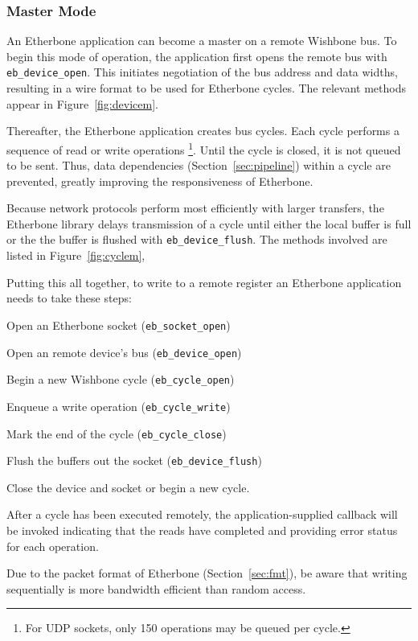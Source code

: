 \documentclass{article}
\newenvironment{packed_enum}{
\begin{enumerate}
  \setlength{\itemsep}{1pt}
  \setlength{\parskip}{0pt}
  \setlength{\parsep}{0pt}
}{\end{enumerate}}
\begin{document}
\subsubsection{Master Mode}

An Etherbone application can become a master on a remote Wishbone bus.
To begin this mode of operation, 
the application first opens the remote bus with \texttt{eb\_device\_open}.
This initiates negotiation of the bus address and data widths,
resulting in a wire format to be used for Etherbone cycles.
The relevant methods appear in Figure~\ref{fig:devicem}.

Thereafter, the Etherbone application creates bus cycles.
Each cycle performs a sequence of read or write operations
\footnote{For UDP sockets,
only 150 operations may be queued per cycle.}.
Until the cycle is closed, it is not queued to be sent.
Thus, data dependencies (Section~\ref{sec:pipeline}) within a cycle
are prevented,
greatly improving the responsiveness of Etherbone.

Because network protocols perform most efficiently with larger transfers,
the Etherbone library delays transmission of a cycle until
either the local buffer is full or the the buffer is flushed with
\texttt{eb\_device\_flush}.
The methods involved are listed in Figure~\ref{fig:cyclem},

Putting this all together,
to write to a remote register an Etherbone application needs to take these
steps:
\begin{packed_enum}
\item Open an Etherbone socket (\texttt{eb\_socket\_open})
\item Open an remote device's bus (\texttt{eb\_device\_open})
\item Begin a new Wishbone cycle (\texttt{eb\_cycle\_open})
\item Enqueue a write operation (\texttt{eb\_cycle\_write})
\item Mark the end of the cycle (\texttt{eb\_cycle\_close})
\item Flush the buffers out the socket (\texttt{eb\_device\_flush})
\item Close the device and socket or begin a new cycle.
\end{packed_enum}

After a cycle has been executed remotely, 
the application-supplied callback will be invoked 
indicating that the reads have completed and 
providing error status for each operation.

Due to the packet format of Etherbone (Section~\ref{sec:fmt}),
be aware that writing sequentially is more bandwidth efficient than random
access.
\end{document}
